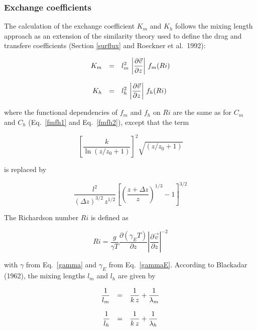 \subsubsection*{Exchange coefficients}

The calculation of the exchange coefficient $K_m$ and
$K_h$ follows the mixing length
approach as an extension of the similarity theory used
to
define the drag and transfere
coefficients (Section \ref{surflux} and Roeckner et
al.~1992):

\begin{equation}
\begin{array}{rcl}
\displaystyle K_m & = & \displaystyle  l_m^2\, \left|
\frac{\partial\vec{v}}{\partial
z}
\right| \, f_m(Ri) \\
&&\\
\displaystyle K_h & = & \displaystyle  l_h^2\, \left|
\frac{\partial\vec{v}}{\partial
z}
\right| \, f_h(Ri)
\end{array}
\end{equation}

where the functional dependencies of $f_m$ and $f_h$
on
$Ri$ are the same as for $C_m$ and $C_h$
(Eq.~\ref{fmfh1} and Eq.~\ref{fmfh2}), except that
the
term 

\begin{equation}
 \left[\frac{k}{\ln(z/z_0+1)}\right]^2\sqrt{(z/z_0+1)}
\end{equation}

is replaced by

\begin{equation}
\frac{l^2}{(\Delta z)^{3/2} \, z^{1/2}}\left[ \left(
\frac{z+\Delta z}{z}\right)^{1/3} -1 \right]^{3/2}
\end{equation}

The Richardson number $Ri$  is defined as

\begin{equation}
Ri=\frac{g}{\gamma T} \frac{\partial (\gamma_E
T)}{\partial z} \left| \frac{\partial \vec{v}}{\partial z}
\right|^{-2}
\end{equation}

with $\gamma$ from Eq.~\ref{gamma} and $\gamma_E$ from Eq.~\ref{gammaE}.  According
to
Blackadar (1962), the mixing lengths $l_m$ and $l_h$
are
given by

\begin{equation}
\begin{array}{rcl}
\displaystyle \frac{1}{l_m} & = & \displaystyle \frac{1}{k\, z}
+\frac{1}{\lambda_m} \\
&&\\
\displaystyle \frac{1}{l_h} & = & \displaystyle \frac{1}{k\, z}
+\frac{1}{\lambda_h}
\end{array}
\end{equation}

